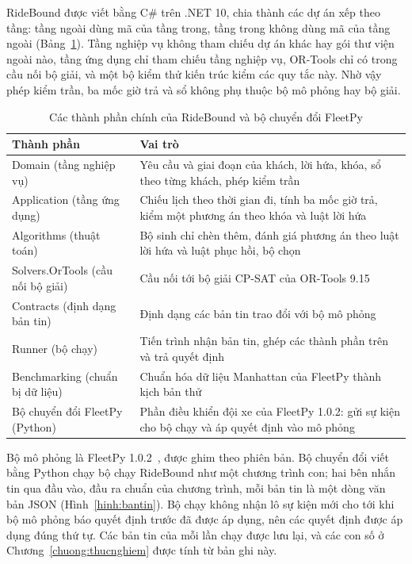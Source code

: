 RideBound được viết bằng C\# trên .NET 10, chia thành các dự án xếp theo tầng: tầng ngoài dùng mã của tầng trong,
tầng trong không dùng mã của tầng ngoài (Bảng~\ref{bang:kientruc}). Tầng nghiệp vụ không tham chiếu dự án khác
hay gói thư viện ngoài nào, tầng ứng dụng chỉ tham chiếu tầng nghiệp vụ, OR-Tools chỉ có trong cầu nối bộ giải,
và một bộ kiểm thử kiến trúc kiểm các quy tắc này. Nhờ vậy phép kiểm trần, ba mốc giờ trả và sổ không phụ thuộc
bộ mô phỏng hay bộ giải.

\begin{table}[htbp]
\centering
\caption{Các thành phần chính của RideBound và bộ chuyển đổi FleetPy}
\label{bang:kientruc}
\small
\begin{tabular}{@{}p{4.6cm}p{10.2cm}@{}}
\toprule
\textbf{Thành phần} & \textbf{Vai trò}\\
\midrule
Domain (tầng nghiệp vụ) & Yêu cầu và giai đoạn của khách, lời hứa, khóa, sổ theo từng khách, phép kiểm trần\\
Application (tầng ứng dụng) & Chiếu lịch theo thời gian đi, tính ba mốc giờ trả, kiểm một phương án theo khóa
và luật lời hứa\\
Algorithms (thuật toán) & Bộ sinh chỉ chèn thêm, đánh giá phương án theo luật lời hứa và luật phục hồi, bộ
chọn\\
Solvers.OrTools (cầu nối bộ giải) & Cầu nối tới bộ giải CP-SAT của OR-Tools 9.15\\
Contracts (định dạng bản tin) & Định dạng các bản tin trao đổi với bộ mô phỏng\\
Runner (bộ chạy) & Tiến trình nhận bản tin, ghép các thành phần trên và trả quyết định\\
Benchmarking (chuẩn bị dữ liệu) & Chuẩn hóa dữ liệu Manhattan của FleetPy thành kịch bản thử\\
Bộ chuyển đổi FleetPy (Python) & Phần điều khiển đội xe của FleetPy 1.0.2: gửi sự kiện cho bộ chạy và áp quyết
định vào mô phỏng\\
\bottomrule
\end{tabular}
\end{table}

Bộ mô phỏng là FleetPy 1.0.2~\cite{engelhardt2026}, được ghim theo phiên bản. Bộ chuyển đổi viết bằng Python
chạy bộ chạy RideBound như một chương trình con; hai bên nhắn tin qua đầu vào, đầu ra chuẩn của chương trình, mỗi
bản tin là một dòng văn bản JSON (Hình~\ref{hinh:bantin}). Bộ chạy không nhận lô sự kiện mới cho tới khi bộ mô
phỏng báo quyết định trước đã được áp dụng, nên các quyết định được áp dụng đúng thứ tự. Các bản tin của mỗi lần
chạy được lưu lại, và các con số ở Chương~\ref{chuong:thucnghiem} được tính từ bản ghi này.

